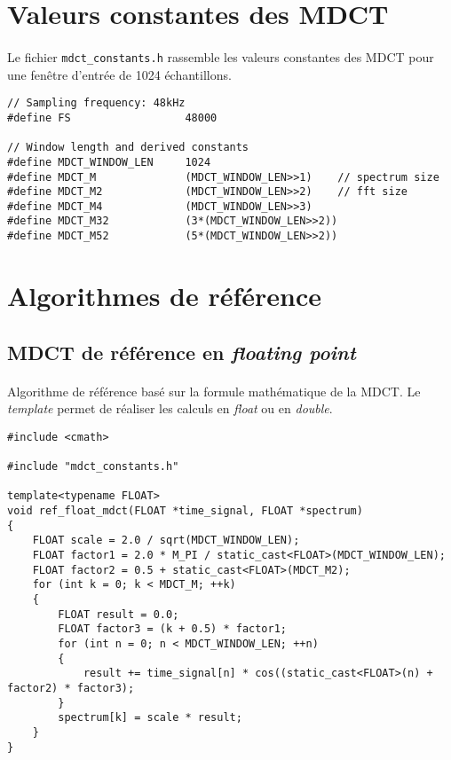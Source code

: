 \documentclass{article}
\begin{document}

\newpage
\section{Valeurs constantes des MDCT}\label{app:mdct_const}
\paragraph{}
Le fichier \texttt{mdct\_constants.h} rassemble les valeurs constantes des MDCT pour une fenêtre d'entrée de 1024 échantillons.
\lstset{language=C++}
\begin{lstlisting}
// Sampling frequency: 48kHz
#define FS                  48000

// Window length and derived constants
#define MDCT_WINDOW_LEN     1024
#define MDCT_M              (MDCT_WINDOW_LEN>>1)    // spectrum size
#define MDCT_M2             (MDCT_WINDOW_LEN>>2)    // fft size
#define MDCT_M4             (MDCT_WINDOW_LEN>>3)
#define MDCT_M32            (3*(MDCT_WINDOW_LEN>>2))
#define MDCT_M52            (5*(MDCT_WINDOW_LEN>>2))
\end{lstlisting}



\newpage
\section{Algorithmes de référence}\label{app:mdct_ref}
\subsection{MDCT de référence en \emph{floating point}}\label{app:mdct_ref_float}
\paragraph{}
Algorithme de référence basé sur la formule mathématique de la MDCT. Le \emph{template} permet de réaliser les calculs en \emph{float} ou en \emph{double}.
\lstset{language=C++}
\begin{lstlisting}
#include <cmath>

#include "mdct_constants.h"

template<typename FLOAT>
void ref_float_mdct(FLOAT *time_signal, FLOAT *spectrum)
{
    FLOAT scale = 2.0 / sqrt(MDCT_WINDOW_LEN);
    FLOAT factor1 = 2.0 * M_PI / static_cast<FLOAT>(MDCT_WINDOW_LEN);
    FLOAT factor2 = 0.5 + static_cast<FLOAT>(MDCT_M2);
    for (int k = 0; k < MDCT_M; ++k)
    {
        FLOAT result = 0.0;
        FLOAT factor3 = (k + 0.5) * factor1;
        for (int n = 0; n < MDCT_WINDOW_LEN; ++n)
        {
            result += time_signal[n] * cos((static_cast<FLOAT>(n) + factor2) * factor3);
        }
        spectrum[k] = scale * result;
    }
}
\end{lstlisting}
\end{document}
